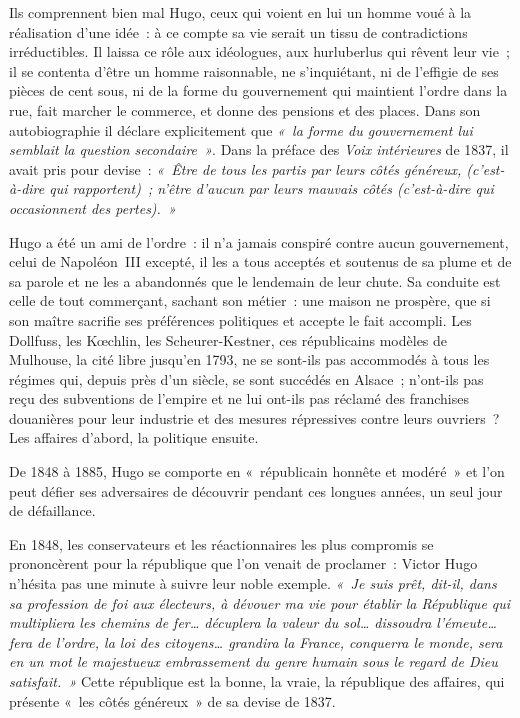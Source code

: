 \documentclass[french,twoside]{book} %
\begin{document}
Ils comprennent bien mal Hugo, ceux qui voient en lui un homme voué à la réalisation d’une idée : à ce compte sa vie serait un tissu de contradictions irréductibles. Il laissa ce rôle aux idéologues, aux hurluberlus qui rêvent leur vie ; il se contenta d’être un homme raisonnable, ne s’inquiétant, ni de l’effigie de ses pièces de cent sous, ni de la forme du gouvernement qui maintient l’ordre dans la rue, fait marcher le commerce, et donne des pensions et des places. Dans son autobiographie il déclare explicitement que \emph{« la forme du gouvernement lui semblait la question secondaire »}. Dans la préface des \emph{Voix intérieures} de 1837, il avait pris pour devise : \emph{« Être de tous les partis par leurs côtés généreux,  
\label{p26}(c’est-à-dire qui rapportent) ; n’être d’aucun par leurs mauvais côtés (c’est-à-dire qui occasionnent des pertes). »}\par
Hugo a été un ami de l’ordre : il n’a jamais conspiré contre aucun gouvernement, celui de Napoléon III excepté, il les a tous acceptés et soutenus de sa plume et de sa parole et ne les a abandonnés que le lendemain de leur chute. Sa conduite est celle de tout commerçant, sachant son métier : une maison ne prospère, que si son maître sacrifie ses préférences politiques et accepte le fait accompli. Les Dollfuss, les Kœchlin, les Scheurer-Kestner, ces républicains modèles de Mulhouse, la cité libre jusqu’en 1793, ne se sont-ils pas accommodés à tous les régimes qui, depuis près d’un siècle, se sont succédés en Alsace ; n’ont-ils pas reçu des subventions de l’empire et ne lui ont-ils pas réclamé des franchises douanières pour leur industrie et des mesures répressives contre leurs ouvriers ? Les affaires d’abord, la politique ensuite.\par
De 1848 à 1885, Hugo se comporte en « républicain honnête et modéré » et l’on peut défier ses adversaires de découvrir pendant ces longues années, un seul jour de défaillance.\par
En 1848, les conservateurs et les réactionnaires les plus compromis se prononcèrent pour la république que l’on venait de proclamer : Victor Hugo n’hésita pas une minute à suivre leur noble exemple. \emph{« Je suis prêt, dit-il, dans sa profession de foi aux électeurs, à dévouer ma vie pour établir la République qui multipliera les chemins de fer… décuplera la valeur du sol… dissoudra l’émeute… fera  
\label{p27}de l’ordre, la loi des citoyens… grandira la France, conquerra le monde, sera en un mot le majestueux embrassement du genre humain sous le regard de Dieu satisfait. »} Cette république est la bonne, la vraie, la république des affaires, qui présente « les côtés généreux » de sa devise de 1837.\par
\end{document}
